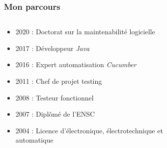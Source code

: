 \begin{frame}
    \frametitle{Mon parcours}

    \begin{columns}
        \begin{column}{0.6\textwidth}
            \begin{itemize}
                \item 2020 : Doctorat sur la maintenabilité logicielle
                \item 2017 : Développeur \emph{Java}
                \item 2016 : Expert automatisation \emph{Cucumber}
                \item 2011 : Chef de projet testing
                \item 2008 : Testeur fonctionnel
                \item 2007 : Diplômé de l'ENSC
                \item 2004 : Licence d'électronique, électrotechnique et automatique
            \end{itemize}
        \end{column}

        \begin{column}{0.4\textwidth}
            \begin{figure}
                \centering
                
                \label{fig:code-graph}
            \end{figure}
        \end{column}
    \end{columns}
\end{frame}

